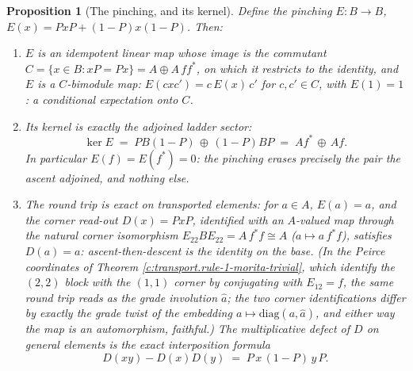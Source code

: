 \documentclass[11pt]{article}
\newtheorem{proposition}[theorem]{Proposition}
\theoremstyle{definition}
\theoremstyle{plain}
\begin{document}
\begin{proposition}[The pinching, and its kernel]\label{c:transport.pinching-kernel}
Define the pinching $E : B \to B$, $E(x) = PxP + (1-P)x(1-P)$. Then:
\begin{enumerate}
\item $E$ is an idempotent linear map whose image is the commutant $C = \{x \in B : xP = Px\} = A \oplus A\,ff^*$, on which it restricts to the identity, and $E$ is a $C$-bimodule map: $E(cxc') = c\,E(x)\,c'$ for $c, c' \in C$, with $E(1) = 1$: a conditional expectation onto $C$.
\item Its kernel is exactly the adjoined ladder sector:
\[
\ker E \;=\; PB(1-P) \,\oplus\, (1-P)BP \;=\; A f^* \,\oplus\, A f .
\]
In particular $E(f) = E(f^*) = 0$: the pinching erases precisely the pair the ascent adjoined, and nothing else.
\item The round trip is exact on transported elements: for $a \in A$, $E(a) = a$, and the corner read-out $D(x) = PxP$, identified with an $A$-valued map through the natural corner isomorphism $E_{22}BE_{22} = A\,f^*f \cong A$ ($a \mapsto a\,f^*f$), satisfies $D(a) = a$: ascent-then-descent is the \emph{identity} on the base. (In the Peirce coordinates of Theorem \ref{c:transport.rule-1-morita-trivial}, which identify the $(2,2)$ block with the $(1,1)$ corner by conjugating with $E_{12} = f$, the same round trip reads as the grade involution $\hat{a}$; the two corner identifications differ by exactly the grade twist of the embedding $a \mapsto \mathrm{diag}(a,\hat a)$, and either way the map is an automorphism, faithful.) The multiplicative defect of $D$ on general elements is the exact interposition formula
\[
D(xy) - D(x)D(y) \;=\; P\,x\,(1-P)\,y\,P .
\]
\end{enumerate}
\end{proposition}
\end{document}
